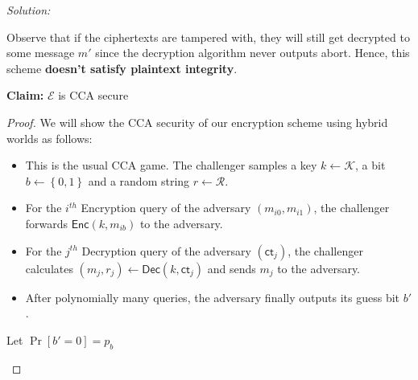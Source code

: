 \documentclass[a4paper, 11pt]{article}
\newenvironment{solution}
    {\textit{Solution:}}
    {\clearpage}
\newcommand{\bit}{\left\{0, 1\right\}}
\newcommand{\ct}{\mathsf{ct}}
\newcommand{\enc}{\mathsf{Enc}}
\newcommand{\dec}{\mathsf{Dec}}
\newcommand{\calE}{\mathcal{E}}
\newcommand{\calK}{\mathcal{K}}
\newcommand{\calR}{\mathcal{R}}
\begin{document}
\begin{solution}
\begin{enumerate}[(a)]
              Observe that if the ciphertexts are tampered with, they will still get decrypted to some message $m'$ since the decryption algorithm never outputs abort. Hence, this scheme \textbf{doesn't satisfy plaintext integrity}.


              \textbf{Claim:} $\calE$ is CCA secure
              \begin{proof}
                  We will show the CCA security of our encryption scheme using hybrid worlds as follows:
                  \begin{world}[World-b]
                      \begin{itemize}
                          \item This is the usual CCA game. The challenger samples a key $k \leftarrow \calK$, a bit $b \leftarrow \bit$ and a random string $r \leftarrow \calR$.
                          \item For the $i^{th}$ Encryption query of the adversary $(m_{i0}, m_{i1})$, the challenger forwards $\enc(k, m_{ib})$ to the adversary.
                          \item For the $j^{th}$ Decryption query of the adversary $(\ct_{j})$, the challenger calculates $(m_j, r_j) \leftarrow \dec(k, \ct_j)$ and sends $m_j$ to the adversary.
                          \item After polynomially many queries, the adversary finally outputs its guess bit $b'$.
                      \end{itemize}
                      Let $\Pr[b' = 0] = p_b$
                  \end{world}


\end{proof}
\end{enumerate}
\end{solution}
\end{document}

